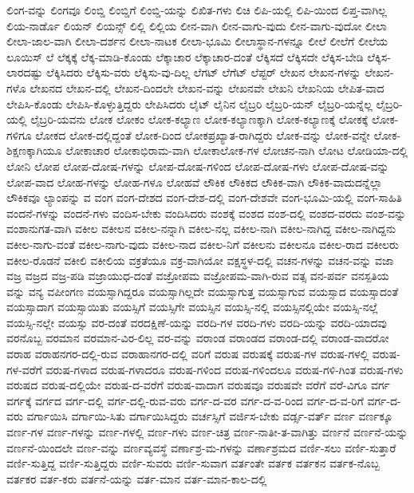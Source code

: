 {ಲಿಂಗ-ವನ್ನು
ಲಿಂಗವೂ
ಲಿಂಬ್ಡಿ
ಲಿಂಬ್ಡಿಗೆ
ಲಿಂಬ್ಡಿ-ಯನ್ನು
ಲಿಖಿತ-ಗಳು
ಲಿಚಿ
ಲಿಪಿ-ಯಲ್ಲಿ
ಲಿಪಿ-ಯಿಂದ
ಲಿಪ್ತ-ವಾಗಿಲ್ಲ
ಲಿಯ-ನಾರ್ಡೊ
ಲಿಯನ್
ಲಿಯನ್ಸ್
ಲಿಲ್ಲಿ
ಲಿಲ್ಲಿಯ
ಲೀನ-ವಾಗಿ
ಲೀನ-ವಾಗು-ವುದು
ಲೀನ-ವಾಗು-ವುದೋ
ಲೀಲಾ
ಲೀಲಾ-ಜಾಲ-ವಾಗಿ
ಲೀಲಾ-ದರ್ಶನ
ಲೀಲಾ-ನಾಟಕ
ಲೀಲಾ-ಭೂಮಿ
ಲೀಲಾಸ್ಥಾನ-ಗಳನ್ನೂ
ಲೀಲೆ
ಲೀಲೆಗೆ
ಲೀಲೆಯ
ಲೂಯಿಸ್
ಲೆ
ಲೆಕ್ಕಕ್ಕೆ
ಲೆಕ್ಕ-ಮಾಡಿ-ಕೊಂಡು
ಲೆಕ್ಕಾಚಾರ
ಲೆಕ್ಕಾಚಾರ-ದಂತೆ
ಲೆಕ್ಕಿಸದೆ
ಲೆಕ್ಕಿಸದೇ
ಲೆಕ್ಕಿಸ-ಬೇಡಿ
ಲೆಕ್ಕಿಸ-ಲಾರದಷ್ಟು
ಲೆಕ್ಕಿಸಿದರು
ಲೆಕ್ಕಿಸು-ವರು
ಲೆಕ್ಕಿಸು-ವು-ದಿಲ್ಲ
ಲೆಗಟ್
ಲೆಗೆಟ್
ಲೆಪ್ಟರ್
ಲೇಖನ
ಲೇಖನ-ಗಳನ್ನು
ಲೇಖನ-ಗಳೊ
ಲೇಖನದ
ಲೇಖನ-ದಲ್ಲಿ
ಲೇಖನ-ದಿಂದಲೇ
ಲೇಖನ-ವನ್ನು
ಲೇಖನವೇ
ಲೇಖನಿ
ಲೇಖನಿಯ
ಲೇಪಿತ-ವಾದ
ಲೇಪಿಸಿ-ಕೊಂಡು
ಲೇಪಿಸಿ-ಕೊಳ್ಳುತ್ತಿದ್ದರು
ಲೇಪಿಸಿದರು
ಲೈಟ್
ಲೈನಿನ
ಲೈಬ್ರರಿ
ಲೈಬ್ರರಿ-ಯನ್
ಲೈಬ್ರರಿ-ಯನ್ನೆಲ್ಲ
ಲೈಬ್ರರಿ-ಯಲ್ಲಿ
ಲೈಬ್ರರಿ-ಯವನು
ಲೋಕ
ಲೋಕಂ
ಲೋಕ-ಕಲ್ಯಾಣ
ಲೋಕ-ಕಲ್ಯಾಣಕ್ಕಾಗಿ
ಲೋಕ-ಕಲ್ಯಾಣಕ್ಕೆ
ಲೋಕಕ್ಕೆ
ಲೋಕ-ಗಳಿಗೂ
ಲೋಕದ
ಲೋಕ-ದಲ್ಲಿದ್ದಂತೆ
ಲೋಕ-ದಿಂದ
ಲೋಕಪ್ರಖ್ಯಾತ-ರಾಗಿದ್ದರು
ಲೋಕ-ವನ್ನು
ಲೋಕ-ವನ್ನೇ
ಲೋಕ-ಶಿಕ್ಷಣಕ್ಕಾಗಿಯೂ
ಲೋಕಾಚಾರ
ಲೋಕಾಭಿರಾಮ-ವಾಗಿ
ಲೋಕಾಲೋಕ-ಗಳ
ಲೋಚನ-ನಾಗಿ
ಲೋಟ
ಲೋಡಿಯಾ-ದಲ್ಲಿ
ಲೋನಿ
ಲೋಪ
ಲೋಪ-ದೋಷ-ಗಳನ್ನು
ಲೋಪ-ದೋಷ-ಗಳಿಂದ
ಲೋಪ-ದೋಷ-ಗಳು
ಲೋಪ-ದೋಷ-ವನ್ನು
ಲೋಪ-ವಾದ
ಲೋಹ-ಗಳನ್ನು
ಲೋಹ-ಗಳೂ
ಲೋಹವೆ
ಲೌಕಿಕ
ಲೌಕಿಕದ
ಲೌಕಿಕ-ವಾಗಿ
ಲೌಕಿಕ-ವಾದುದನ್ನೆಲ್ಲಾ
ಲೌಕಿಕವೂ
ಲ್ಯಾಂಪನ್ನು
ವ
ವಂಗ
ವಂಗ-ದೇಶದ
ವಂಗ-ದೇಶ-ದಲ್ಲಿ
ವಂಗ-ದೇಶವೇ
ವಂಗ-ಭೂಮಿ-ಯಲ್ಲಿ
ವಂಗ-ಸಾಹಿತಿ
ವಂದನೆ-ಗಳನ್ನು
ವಂದನೆ-ಗಳು
ವಂದಿಸ-ಬೇಕು
ವಂದಿಸಿದರು
ವಂಶಕ್ಕೆ
ವಂಶದ
ವಂಶ-ದಲ್ಲಿ
ವಂಶದ-ವರದು
ವಂಶ-ವನ್ನು
ವಂಶಾನುಗತ-ವಾಗಿ
ವಕೀಲ
ವಕೀಲನ
ವಕೀಲ-ನನ್ನಾಗಿ
ವಕೀಲ-ನಲ್ಲ
ವಕೀಲ-ನಾಗಿ
ವಕೀಲ-ನಾಗಿದ್ದ
ವಕೀಲ-ನಾಗಿದ್ದನು
ವಕೀಲ-ನಾಗು-ವಂತೆ
ವಕೀಲ-ನಾಗು-ವುದು
ವಕೀಲ-ನಾದ
ವಕೀಲ-ನಿಗೆ
ವಕೀಲನು
ವಕೀಲನೂ
ವಕೀಲ-ರಾದ
ವಕೀಲರು
ವಕೀಲ-ರೊಡನೆ
ವಕೀಲಿ
ವಕೀಲಿಯ
ವಕ್ರತೆಯೂ
ವಕ್ರ-ವಾಗಿಯೋ
ವಕ್ಷಸ್ಥಳ-ದಲ್ಲಿ
ವಚನ-ಗಳನ್ನು
ವಚನ-ವನ್ನು
ವಜಾ
ವಜ್ರ
ವಜ್ರದ
ವಜ್ರ-ಪಡಿ
ವಜ್ರಾಯುಧ-ದಂತೆ
ವಜ್ರೋಪಮ
ವಜ್ರೋಪಮ-ವಾಗಿ-ರುವ
ವತ್ಸ
ವನ-ಪರ್ವ
ವನಸ್ಪತಿಯ
ವನ್ನು
ವನ್ಯ
ವಪೀಂಗಣ
ವಯಸ್ಸಾಗಿದ್ದರೂ
ವಯಸ್ಸಾಗಿಲ್ಲದೇ
ವಯಸ್ಸಾಗುತ್ತ
ವಯಸ್ಸಾಗುವ
ವಯಸ್ಸಾದ
ವಯಸ್ಸಾದಂತೆ
ವಯಸ್ಸಾದಾಗ
ವಯಸ್ಸಾಯಿತು
ವಯಸ್ಸಿಗೆ
ವಯಸ್ಸಿಗೇ
ವಯಸ್ಸಿನ
ವಯಸ್ಸಿ-ನಲ್ಲಿ
ವಯಸ್ಸಿನಲ್ಲಿಯೇ
ವಯಸ್ಸಿ-ನಲ್ಲೆ
ವಯಸ್ಸಿ-ನಲ್ಲೇ
ವಯಸ್ಸು
ವರ-ದಂತೆ
ವರದಕ್ಷಿಣೆ-ಯನ್ನು
ವರದಿ-ಗಳ
ವರದಿ-ಗಳು
ವರದಿ-ಯನ್ನು
ವರದಿ-ಯಾದವು
ವರನೊಬ್ಬ
ವರಮಾನ
ವರಮಾನ-ವಿರ-ಲಿಲ್ಲ
ವರ-ವನ್ನು
ವರಾಂಡ
ವರಾಂಡದ
ವರಾಂಡ-ದಲ್ಲಿ
ವರಾಂಡ-ವಾದರೋ
ವರಾಹ
ವರಾಹನಗರ-ದಲ್ಲಿ-ರುವ
ವರಾಹಾನಗರ-ದಲ್ಲಿ
ವರಿಗೆ
ವರುಷ
ವರುಷಕ್ಕೆ
ವರುಷ-ಗಳ
ವರುಷ-ಗಳಲ್ಲಿ
ವರುಷ-ಗಳ-ವರೆಗೆ
ವರುಷ-ಗಳಾದ
ವರುಷ-ಗಳಾದರೂ
ವರುಷ-ಗಳಿಂದ
ವರುಷ-ಗಳಿಂದಲೂ
ವರುಷ-ಗಳಿ-ಗಿಂತ
ವರುಷ-ಗಳು
ವರುಷದ
ವರುಷ-ದಲ್ಲಿಯೇ
ವರುಷ-ದ-ವರೆಗೆ
ವರುಷ-ವಾದಾಗ
ವರುಷವೂ
ವರುಷವೇ
ವರೆಗೆ
ವರೆ-ವಿಗೂ
ವರ್ಗ
ವರ್ಗಕ್ಕೆ
ವರ್ಗದ
ವರ್ಗ-ದಲ್ಲಿ
ವರ್ಗ-ದಲ್ಲಿ-ರುವ-ವರು
ವರ್ಗ-ದ-ವರ
ವರ್ಗ-ದ-ವ-ರಿಂದ
ವರ್ಗ-ದ-ವ-ರಿಗೆ
ವರ್ಗ-ದ-ವರು
ವರ್ಗಾಯಿಸಿ
ವರ್ಗಾಯಿ-ಸಿತು
ವರ್ಗಾಯಿಸಿದ್ದರು
ವರ್ಚಸ್ಸಿಗೆ
ವರ್ಜಿಸ-ಬೇಕು
ವರ್ಡ್ಸ-ವರ್ತ್
ವರ್ಣ
ವರ್ಣಕ್ಕೂ
ವರ್ಣ-ಗಳ
ವರ್ಣ-ಗಳನ್ನು
ವರ್ಣ-ಗಳಲ್ಲಿ
ವರ್ಣ-ಗಳು
ವರ್ಣ-ಚಿತ್ರ
ವರ್ಣ-ನಾತೀ-ತ-ವಾಗಿತ್ತು
ವರ್ಣನೆ
ವರ್ಣನೆ-ಯನ್ನು
ವರ್ಣನೆ-ಯಿಂದಲೇ
ವರ್ಣ-ವನ್ನು
ವರ್ಣವ್ಯವಸ್ಥೆ
ವರ್ಣಾಶ್ರ-ಮ-ಗಳನ್ನು
ವರ್ಣಾಶ್ರಮದ
ವರ್ಣಿ-ಸಲು
ವರ್ಣಿ-ಸುತ್ತಾರೆ
ವರ್ಣಿ-ಸುತ್ತಿದ್ದ
ವರ್ಣಿ-ಸುತ್ತಿದ್ದರು
ವರ್ಣಿ-ಸುವರು
ವರ್ಣಿ-ಸುವಾಗ
ವರ್ತಂತೇ
ವರ್ತಕ
ವರ್ತಕನ
ವರ್ತಕ-ನೊಬ್ಬ
ವರ್ತಕರ
ವರ್ತ-ಕರು
ವರ್ತನೆ-ಯನ್ನು
ವರ್ತ-ಮಾನ
ವರ್ತ-ಮಾನ-ಕಾಲ-ದಲ್ಲಿ
}
